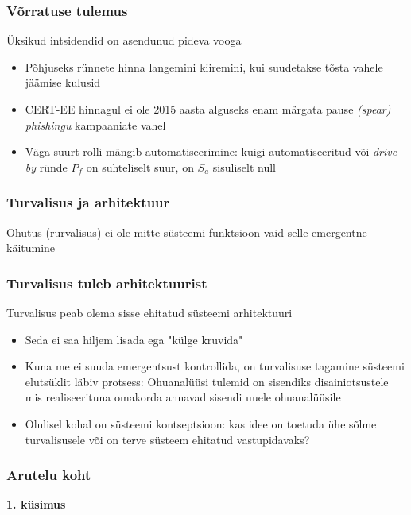 \begin{frame}[fragile]
  \frametitle{Võrratuse tulemus}
	Üksikud intsidendid on asendunud pideva vooga
	\begin{itemize}
		\item Põhjuseks rünnete hinna langemini kiiremini, kui suudetakse tõsta vahele jäämise kulusid
		\item CERT-EE hinnagul ei ole 2015 aasta alguseks enam märgata pause \emph{(spear) phishingu} kampaaniate vahel
		\item Väga suurt rolli mängib automatiseerimine: kuigi automatiseeritud või \emph{drive-by} ründe $P_f$ on suhteliselt suur, on $S_a$ sisuliselt null
	\end{itemize}
\end{frame}

\begin{frame}[fragile]
  \frametitle{Turvalisus ja arhitektuur}
	\begin{center}
		Ohutus (rurvalisus) ei ole mitte süsteemi funktsioon vaid selle emergentne käitumine
	\end{center}
	\cite{leveson2011engineering}
\end{frame}

\begin{frame}[fragile]
  \frametitle{Turvalisus tuleb arhitektuurist}
	Turvalisus peab olema sisse ehitatud süsteemi arhitektuuri
	\begin{itemize}
		\item Seda ei saa hiljem lisada ega "külge kruvida"
		\item Kuna me ei suuda emergentsust kontrollida, on turvalisuse tagamine süsteemi elutsüklit läbiv protsess: Ohuanalüüsi tulemid on sisendiks disainiotsustele mis realiseerituna omakorda annavad sisendi uuele ohuanalüüsile
		\item Olulisel kohal on süsteemi kontseptsioon: kas idee on toetuda ühe sõlme turvalisusele või on terve süsteem ehitatud vastupidavaks?
	\end{itemize}
\end{frame}

\begin{frame}[fragile]
  \frametitle{Arutelu koht}
		\begin{center}
			\textbf{1. küsimus}
		\end{center}
\end{frame}


